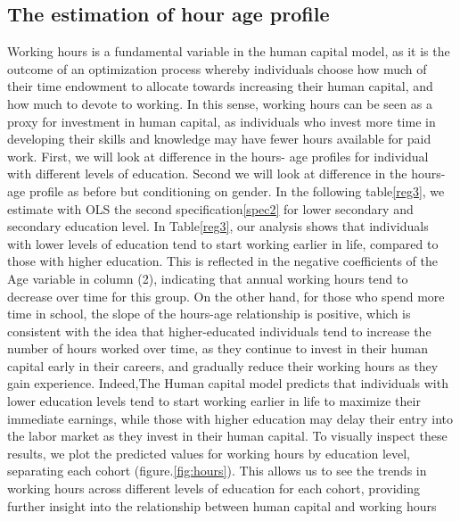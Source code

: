 \documentclass{sistedes}
\begin{document}
\subsection{The estimation of hour age profile}
Working hours is a fundamental variable in the human capital model, as it is the outcome of an optimization process
whereby individuals choose how much of their time endowment to allocate towards increasing their human capital, and how
much to devote to working. In this sense, working hours can be seen as a proxy for investment in human capital, as
individuals who invest more time in developing their skills and knowledge may have fewer hours available for paid
work.\newline
First, we will look at difference in the hours- age profiles for individual with different levels of education. Second we
will look at difference in the hours-age profile as before but conditioning on gender. In the following table\ref{reg3}, we estimate with OLS the second specification\ref{spec2} for lower secondary and secondary education level.
\newline
In Table\ref{reg3}, our analysis shows that individuals with lower levels of education tend to start working earlier in life, compared to those with higher education. This is reflected in the negative coefficients of the Age variable in column (2), indicating that annual working hours tend to decrease over time for this group. 
\newline
On the other hand, for those who spend more time in school, the slope of the hours-age relationship is positive, which is consistent with the idea that higher-educated individuals tend to increase the number of hours worked over time, as they continue to invest in their human capital early in their careers, and gradually reduce their working hours as they gain experience. 
Indeed,The Human capital model predicts that individuals with lower education levels tend to start working earlier in life to maximize their immediate earnings, while those with higher education may delay their entry into the labor market as they invest in their human capital.
\newline
To visually inspect these results, we plot the predicted values for working hours by education level, separating each
cohort (figure.\ref{fig:hours}). This allows us to see the trends in working hours across different levels of education for each cohort,
providing further insight into the relationship between human capital and working hours
\newline
\end{document}
